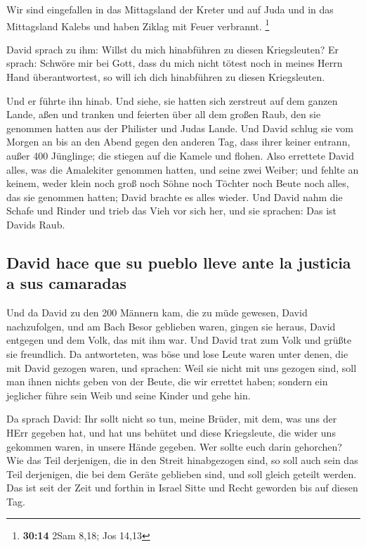  Wir sind eingefallen in das Mittagsland der Kreter und
auf Juda und in das Mittagsland Kalebs und haben Ziklag mit Feuer
verbrannt. \footnote{\textbf{30:14} 2Sam 8,18; Jos 14,13}

 David sprach zu ihm: Willst du mich hinabführen zu
diesen Kriegsleuten? Er sprach: Schwöre mir bei Gott, dass du mich nicht
tötest noch in meines Herrn Hand überantwortest, so will ich dich
hinabführen zu diesen Kriegsleuten.

 Und er führte ihn hinab. Und siehe, sie hatten sich
zerstreut auf dem ganzen Lande, aßen und tranken und feierten über all
dem großen Raub, den sie genommen hatten aus der Philister und Judas
Lande.  Und David schlug sie vom Morgen an bis an den
Abend gegen den anderen Tag, dass ihrer keiner entrann, außer 400
Jünglinge; die stiegen auf die Kamele und flohen.  Also
errettete David alles, was die Amalekiter genommen hatten, und seine
zwei Weiber;  und fehlte an keinem, weder klein noch groß
noch Söhne noch Töchter noch Beute noch alles, das sie genommen hatten;
David brachte es alles wieder.  Und David nahm die Schafe
und Rinder und trieb das Vieh vor sich her, und sie sprachen: Das ist
Davids Raub.

\hypertarget{david-hace-que-su-pueblo-lleve-ante-la-justicia-a-sus-camaradas}{%
\subsection{David hace que su pueblo lleve ante la justicia a sus
camaradas}\label{david-hace-que-su-pueblo-lleve-ante-la-justicia-a-sus-camaradas}}

 Und da David zu den 200 Männern kam, die zu müde
gewesen, David nachzufolgen, und am Bach Besor geblieben waren, gingen
sie heraus, David entgegen und dem Volk, das mit ihm war. Und David trat
zum Volk und grüßte sie freundlich.  Da antworteten, was
böse und lose Leute waren unter denen, die mit David gezogen waren, und
sprachen: Weil sie nicht mit uns gezogen sind, soll man ihnen nichts
geben von der Beute, die wir errettet haben; sondern ein jeglicher führe
sein Weib und seine Kinder und gehe hin.

 Da sprach David: Ihr sollt nicht so tun, meine Brüder,
mit dem, was uns der HErr gegeben hat, und hat uns behütet und diese
Kriegsleute, die wider uns gekommen waren, in unsere Hände gegeben.
 Wer sollte euch darin gehorchen? Wie das Teil
derjenigen, die in den Streit hinabgezogen sind, so soll auch sein das
Teil derjenigen, die bei dem Geräte geblieben sind, und soll gleich
geteilt werden.  Das ist seit der Zeit und forthin in
Israel Sitte und Recht geworden bis auf diesen Tag.


